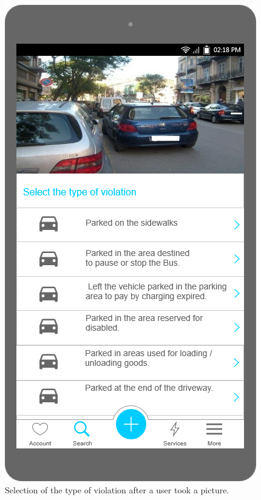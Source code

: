 \documentclass[a4paper]{article}
\newcommand{\mockupheight}{0.4\textheight}
\begin{document}
\begin{figure}[H]
\centering
\includegraphics[height=\mockupheight]{mockup/select_violation}
\caption{Selection of the type of violation after a user took a
picture.}
\end{figure}
\end{document}
